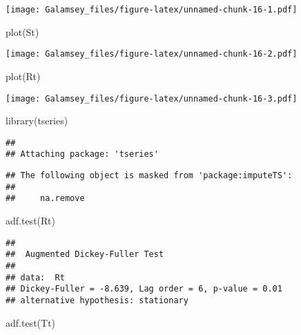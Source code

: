 \documentclass[
]{report}
\newenvironment{Shaded}{\begin{snugshade}}{\end{snugshade}}
\newcommand{\FunctionTok}[1]{\textcolor[rgb]{0.00,0.00,0.00}{#1}}
\newcommand{\NormalTok}[1]{#1}
\begin{document}
\texttt{[image: Galamsey\_files/figure-latex/unnamed-chunk-16-1.pdf]}

\begin{Shaded}
\begin{Highlighting}[]
\FunctionTok{plot}\NormalTok{(St)}
\end{Highlighting}
\end{Shaded}

\texttt{[image: Galamsey\_files/figure-latex/unnamed-chunk-16-2.pdf]}

\begin{Shaded}
\begin{Highlighting}[]
\FunctionTok{plot}\NormalTok{(Rt)}
\end{Highlighting}
\end{Shaded}

\texttt{[image: Galamsey\_files/figure-latex/unnamed-chunk-16-3.pdf]}

\begin{Shaded}
\begin{Highlighting}[]
\FunctionTok{library}\NormalTok{(tseries)}
\end{Highlighting}
\end{Shaded}

\begin{verbatim}
## 
## Attaching package: 'tseries'
\end{verbatim}

\begin{verbatim}
## The following object is masked from 'package:imputeTS':
## 
##     na.remove
\end{verbatim}

\begin{Shaded}
\begin{Highlighting}[]
\FunctionTok{adf.test}\NormalTok{(Rt)}
\end{Highlighting}
\end{Shaded}

\begin{verbatim}
## 
##  Augmented Dickey-Fuller Test
## 
## data:  Rt
## Dickey-Fuller = -8.639, Lag order = 6, p-value = 0.01
## alternative hypothesis: stationary
\end{verbatim}

\begin{Shaded}
\begin{Highlighting}[]
\FunctionTok{adf.test}\NormalTok{(Tt)}
\end{Highlighting}
\end{Shaded}
\end{document}
